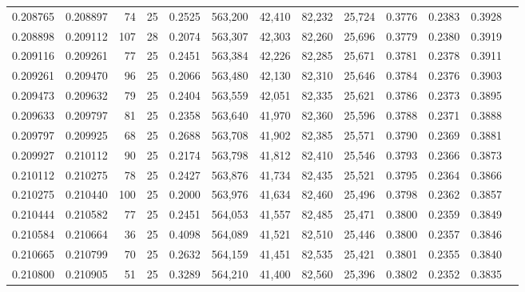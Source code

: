 \begin{tabular}{rrrrrrrrrrrrr}
0.208765 & 0.208897 &    74 &  25 &                                     0.2525 & 563,200 &  42,410 &  82,232 &  25,724 & 0.3776 & 0.2383 & 0.3928 \\
0.208898 & 0.209112 &   107 &  28 &                                     0.2074 & 563,307 &  42,303 &  82,260 &  25,696 & 0.3779 & 0.2380 & 0.3919 \\
0.209116 & 0.209261 &    77 &  25 &                                     0.2451 & 563,384 &  42,226 &  82,285 &  25,671 & 0.3781 & 0.2378 & 0.3911 \\
0.209261 & 0.209470 &    96 &  25 &                                     0.2066 & 563,480 &  42,130 &  82,310 &  25,646 & 0.3784 & 0.2376 & 0.3903 \\
0.209473 & 0.209632 &    79 &  25 &                                     0.2404 & 563,559 &  42,051 &  82,335 &  25,621 & 0.3786 & 0.2373 & 0.3895 \\
0.209633 & 0.209797 &    81 &  25 &                                     0.2358 & 563,640 &  41,970 &  82,360 &  25,596 & 0.3788 & 0.2371 & 0.3888 \\
0.209797 & 0.209925 &    68 &  25 &                                     0.2688 & 563,708 &  41,902 &  82,385 &  25,571 & 0.3790 & 0.2369 & 0.3881 \\
0.209927 & 0.210112 &    90 &  25 &                                     0.2174 & 563,798 &  41,812 &  82,410 &  25,546 & 0.3793 & 0.2366 & 0.3873 \\
0.210112 & 0.210275 &    78 &  25 &                                     0.2427 & 563,876 &  41,734 &  82,435 &  25,521 & 0.3795 & 0.2364 & 0.3866 \\
0.210275 & 0.210440 &   100 &  25 &                                     0.2000 & 563,976 &  41,634 &  82,460 &  25,496 & 0.3798 & 0.2362 & 0.3857 \\
0.210444 & 0.210582 &    77 &  25 &                                     0.2451 & 564,053 &  41,557 &  82,485 &  25,471 & 0.3800 & 0.2359 & 0.3849 \\
0.210584 & 0.210664 &    36 &  25 &                                     0.4098 & 564,089 &  41,521 &  82,510 &  25,446 & 0.3800 & 0.2357 & 0.3846 \\
0.210665 & 0.210799 &    70 &  25 &                                     0.2632 & 564,159 &  41,451 &  82,535 &  25,421 & 0.3801 & 0.2355 & 0.3840 \\
0.210800 & 0.210905 &    51 &  25 &                                     0.3289 & 564,210 &  41,400 &  82,560 &  25,396 & 0.3802 & 0.2352 & 0.3835 \\

\end{tabular}
